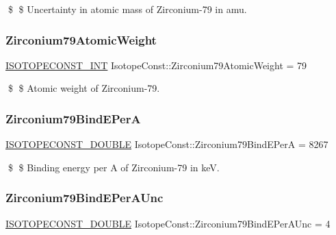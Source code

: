 \$ \$ Uncertainty in atomic mass of Zirconium-\/79 in amu. \mbox{\label{group___isotope_const-_zirconium-_zr79_gad140427d67c40a8d82fce63e6e8378d3}} 
\subsubsection{\texorpdfstring{Zirconium79\+Atomic\+Weight}{Zirconium79AtomicWeight}}
{\footnotesize\ttfamily \mbox{\hyperlink{group___isotope_const-_macros_ga5f18360b3e99483a35c32d789e62621c}{I\+S\+O\+T\+O\+P\+E\+C\+O\+N\+S\+T\+\_\+\+I\+NT}} Isotope\+Const\+::\+Zirconium79\+Atomic\+Weight = 79}

\$ \$ Atomic weight of Zirconium-\/79. \mbox{\label{group___isotope_const-_zirconium-_zr79_gabee8625a633944ba4705ec3fe4265947}} 
\subsubsection{\texorpdfstring{Zirconium79\+Bind\+E\+PerA}{Zirconium79BindEPerA}}
{\footnotesize\ttfamily \mbox{\hyperlink{group___isotope_const-_macros_ga8f45a7272ce02c0b4c65c44636ed719a}{I\+S\+O\+T\+O\+P\+E\+C\+O\+N\+S\+T\+\_\+\+D\+O\+U\+B\+LE}} Isotope\+Const\+::\+Zirconium79\+Bind\+E\+PerA = 8267}

\$ \$ Binding energy per A of Zirconium-\/79 in keV. \mbox{\label{group___isotope_const-_zirconium-_zr79_ga7e57df96acec2235203abfc1a8c2fe8b}} 
\subsubsection{\texorpdfstring{Zirconium79\+Bind\+E\+Per\+A\+Unc}{Zirconium79BindEPerAUnc}}
{\footnotesize\ttfamily \mbox{\hyperlink{group___isotope_const-_macros_ga8f45a7272ce02c0b4c65c44636ed719a}{I\+S\+O\+T\+O\+P\+E\+C\+O\+N\+S\+T\+\_\+\+D\+O\+U\+B\+LE}} Isotope\+Const\+::\+Zirconium79\+Bind\+E\+Per\+A\+Unc = 4}

